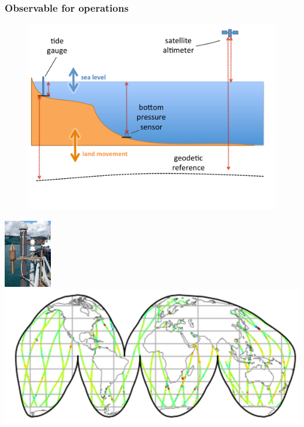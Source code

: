 \begin{frame}
\frametitle{Observable for operations}
\begin{minipage}{0.6\textwidth}
    \begin{figure}      
    \includegraphics[height=\textheight]{figures/diagrams/sealevel_cartoon.pdf}
    \end{figure}
\end{minipage}
\begin{minipage}{0.35\textwidth}
    \includegraphics[height=3cm]{figures/images/tidegaugeEg.png}
    \vspace{1cm}
    \includegraphics[height=\textheight]{figures/maps/altimeterCoverageEg.png}
\end{minipage}

\end{frame}

